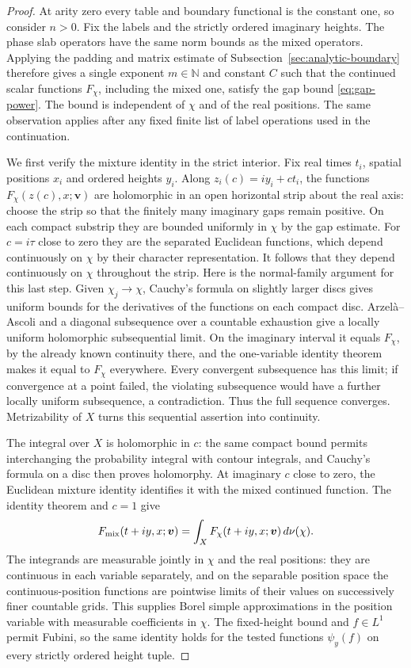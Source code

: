 \begin{proof}
At arity zero every table and boundary functional is the constant one,
so consider $n>0$. Fix the labels and the strictly ordered imaginary
heights. The phase slab operators have the same norm bounds as the mixed
operators. Applying the padding and matrix estimate of
Subsection~\ref{sec:analytic-boundary} therefore gives a single exponent
$m\in\mathbb N$ and constant $C$ such that the continued scalar
functions $F_\chi$, including the mixed one, satisfy the gap bound
\eqref{eq:gap-power}. The bound is independent of $\chi$ and of the real
positions. The same observation applies after any fixed finite list of
label operations used in the continuation.

We first verify the mixture identity in the strict interior. Fix real
times $t_i$, spatial positions $x_i$ and ordered heights $y_i$. Along
$z_i(c)=iy_i+ct_i$, the functions $F_\chi(z(c),x;\boldsymbol v)$
are holomorphic in an open horizontal strip about the real axis: choose
the strip so that the finitely many imaginary gaps remain positive.
On each compact substrip they are bounded uniformly in $\chi$ by the
gap estimate. For $c=i\tau$ close to zero they are the separated
Euclidean functions, which depend continuously on $\chi$ by their
character representation. It follows that they depend continuously on
$\chi$ throughout the strip. Here is the normal-family argument for
this last step. Given $\chi_j\to\chi$, Cauchy's formula on slightly
larger discs gives uniform bounds for the derivatives of the functions
on each compact disc. Arzel\`a--Ascoli and a diagonal subsequence over
a countable exhaustion give a locally uniform holomorphic subsequential
limit. On the imaginary interval it equals $F_\chi$, by the already
known continuity there, and the one-variable identity theorem makes it
equal to $F_\chi$ everywhere. Every convergent subsequence has this
limit; if convergence at a point failed, the violating subsequence
would have a further locally uniform subsequence, a contradiction.
Thus the full sequence converges. Metrizability of $X$ turns this
sequential assertion into continuity.

The integral over $X$ is holomorphic in $c$: the same compact bound
permits interchanging the probability integral with contour integrals,
and Cauchy's formula on a disc then proves holomorphy. At imaginary
$c$ close to zero, the Euclidean mixture identity identifies it with
the mixed continued function. The identity theorem and $c=1$ give
\[
 F_{\rm mix}(t+iy,x;\boldsymbol v)
       =\int_X F_\chi(t+iy,x;\boldsymbol v)\,d\nu(\chi).
\]
The integrands are measurable jointly in $\chi$ and the real positions:
they are continuous in each variable separately, and on the separable
position space the continuous-position functions are pointwise limits
of their values on successively finer countable grids. This supplies
Borel simple approximations in the position variable with measurable
coefficients in $\chi$. The fixed-height bound and $f\in L^1$ permit
Fubini, so the same identity holds for the tested functions
$\psi_y(f)$ on every strictly ordered height tuple.


\end{proof}
